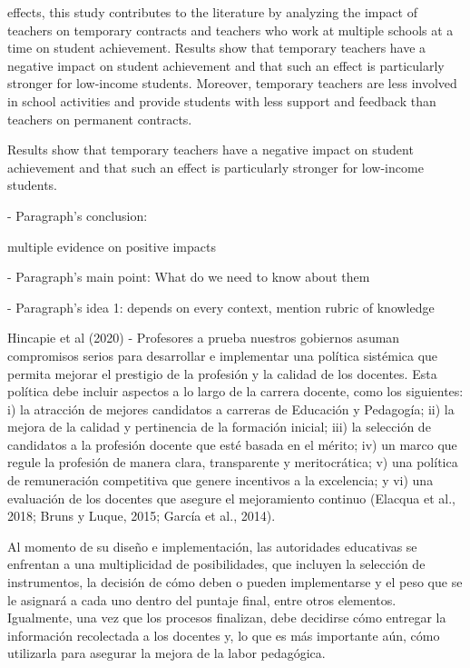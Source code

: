 effects, this study contributes to the literature by analyzing the impact of teachers on temporary contracts and teachers who work at multiple schools at a time on student achievement. Results show that temporary teachers have a negative impact on student achievement and that such an effect is particularly stronger for low-income students. Moreover, temporary teachers are less involved in school activities and provide students with less support and feedback than teachers on permanent contracts. \citep{Duflo_et_al_2009}


Results show that temporary teachers have a negative impact on student achievement and that such an effect is particularly stronger for low-income students. \citep{Marotta_2019}


- Paragraph's conclusion: 

multiple evidence on positive impacts






- Paragraph's main point: What do we need to know about them

- Paragraph's idea 1: depends on every context, mention rubric of knowledge

Hincapie et al (2020) - Profesores a prueba
nuestros gobiernos asuman compromisos serios para desarrollar e implementar una política sistémica que permita mejorar el prestigio de la profesión y la calidad de los docentes. Esta política debe incluir aspectos a lo largo de la carrera docente, como los siguientes: i) la atracción de mejores candidatos a carreras de Educación y Pedagogía; ii) la mejora de la calidad y pertinencia de la formación inicial; iii) la selección de candidatos a la profesión docente que esté basada en el mérito; iv) un marco que regule la profesión de manera clara, transparente y meritocrática; v) una política de remuneración competitiva que genere incentivos a la excelencia; y vi) una evaluación de los docentes que asegure el mejoramiento continuo (Elacqua et al., 2018; Bruns y Luque, 2015; García et al., 2014).

Al momento de su diseño e implementación, las autoridades educativas se enfrentan a una multiplicidad de posibilidades, que incluyen la selección de instrumentos, la decisión de cómo deben o pueden implementarse y el peso que se le asignará a cada uno dentro del puntaje final, entre otros elementos. Igualmente, una vez que los procesos finalizan, debe decidirse cómo entregar la información recolectada a los docentes y, lo que es más importante aún, cómo utilizarla para asegurar la mejora de la labor pedagógica.

